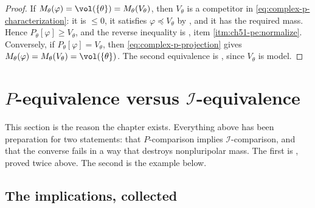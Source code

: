 \begin{proof}
If \(M_\theta(\varphi)=\vol(\{\theta\})=M_\theta(V_\theta)\), then
\(V_\theta\) is a competitor in
\eqref{eq:complex-p-characterization}: it is \(\leq0\), it satisfies
\(\varphi\preceq V_\theta\) by
, and it has the required mass.
Hence \(P_\theta[\varphi]\geq V_\theta\), and the reverse inequality is
, item \cref{itm:ch51-pe:normalize}.
Conversely, if \(P_\theta[\varphi]=V_\theta\), then
\eqref{eq:complex-p-projection} gives
\(M_\theta(\varphi)=M_\theta(V_\theta)=\vol(\{\theta\})\).  The second
equivalence is , since
\(V_\theta\) is model.
\end{proof}

\section{\texorpdfstring{\(P\)}{P}-equivalence versus
\texorpdfstring{\(\mathcal I\)}{I}-equivalence}
\label{sec:ch51-p-vs-i}

This section is the reason the chapter exists.  Everything above has been
preparation for two statements: that \(P\)-comparison implies
\(\mathcal I\)-comparison, and that the converse fails in a way that
destroys nonpluripolar mass.  The first is
, proved twice above.  The second
is the example below.

\subsection{The implications, collected}
\label{sec:ch51-implications}

